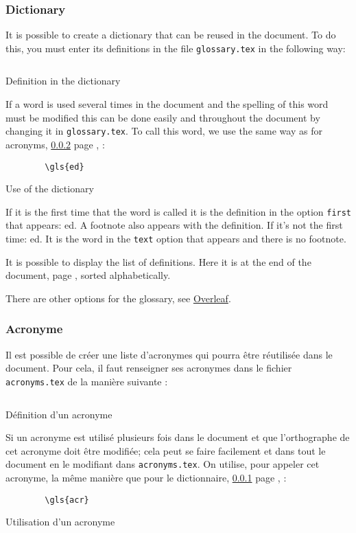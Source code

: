 \subsubsection{Dictionary} \label{dictionary}
It is possible to create a dictionary that can be reused in the document.
To do this, you must enter its definitions in the file \verb=glossary.tex= in the following way:
\begin{code}
    \inputminted{latex}{glossary.tex}
    \caption{Definition in the dictionary}
\end{code}

If a word is used several times in the document and the spelling of this word must be modified
this can be done easily and throughout the document by changing it in \verb=glossary.tex=.
To call this word, we use the same way as for acronyms, \ref{acronym} page \pageref{acronym}, :
\begin{code}
    \begin{verbatim}
        \gls{ed}
\end{verbatim}
    \caption{Use of the dictionary}
\end{code}

If it is the first time that the word is called it is the definition in the option \verb=first= that appears: \gls{ed}.
A footnote also appears with the definition. \newline
If it's not the first time: \gls{ed}. It is the word in the \verb=text= option that appears and there is no footnote.

It is possible to display the list of definitions. Here it is at the end of the document,
page \pageref{domaindictionary}, sorted alphabetically.

There are other options for the glossary, see \href{https://fr.overleaf.com/learn/latex/Glossaries}{Overleaf}.

\subsubsection{Acronyme} \label{acronym}
Il est possible de créer une liste d'acronymes qui pourra être réutilisée dans le document.
Pour cela, il faut renseigner ses acronymes dans le fichier \verb=acronyms.tex= de la manière suivante :
\begin{code}
    \inputminted{latex}{acronyms.tex}
    \caption{Définition d'un acronyme}
\end{code}

Si un acronyme est utilisé plusieurs fois dans le document et que l'orthographe de cet acronyme doit être modifiée;
cela peut se faire facilement et dans tout le document en le modifiant dans \verb=acronyms.tex=.
On utilise, pour appeler cet acronyme, la même manière que pour le dictionnaire, \ref{dictionary} page \pageref{dictionary}, :
\begin{code}
    \begin{verbatim}
        \gls{acr}
\end{verbatim}
    \caption{Utilisation d'un acronyme}
\end{code}

